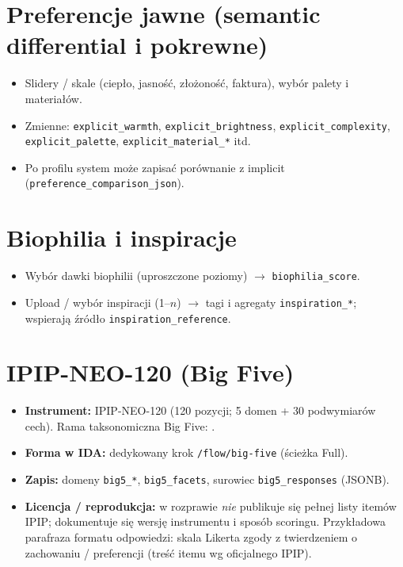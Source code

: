 \section{Preferencje jawne (semantic differential i pokrewne)}
\label{app:b:sec:explicit}

\begin{itemize}
  \item Slidery / skale (ciepło, jasność, złożoność, faktura), wybór palety i materiałów.
  \item Zmienne: \texttt{explicit\_warmth}, \texttt{explicit\_brightness}, \texttt{explicit\_complexity}, \texttt{explicit\_palette}, \texttt{explicit\_material\_*} itd.
  \item Po profilu system może zapisać porównanie z implicit (\allowbreak\texttt{preference\_comparison\_json}).
\end{itemize}

\section{Biophilia i inspiracje}
\label{app:b:sec:biophilia}

\begin{itemize}
  \item Wybór dawki biophilii (uproszczone poziomy) $\rightarrow$ \texttt{biophilia\_score}.
  \item Upload / wybór inspiracji (1--$n$) $\rightarrow$ tagi i agregaty \texttt{inspiration\_*}; wspierają źródło \texttt{inspiration\_reference}.
\end{itemize}

\section{IPIP-NEO-120 (Big Five)}
\label{app:b:sec:ipip}

\begin{itemize}
  \item \textbf{Instrument:} IPIP-NEO-120 (120 pozycji; 5 domen + 30 podwymiarów cech). Rama taksonomiczna Big Five: \cite{john2008bigfive}.
  \item \textbf{Forma w IDA:} dedykowany krok \texttt{/flow/big-five} (ścieżka Full).
  \item \textbf{Zapis:} domeny \texttt{big5\_*}, \texttt{big5\_facets}, surowiec \texttt{big5\_responses} (JSONB).
  \item \textbf{Licencja / reprodukcja:} w rozprawie \emph{nie} publikuje się pełnej listy itemów IPIP; dokumentuje się wersję instrumentu i sposób scoringu. Przykładowa parafraza formatu odpowiedzi: skala Likerta zgody z twierdzeniem o zachowaniu / preferencji (treść itemu wg oficjalnego IPIP).
\end{itemize}

